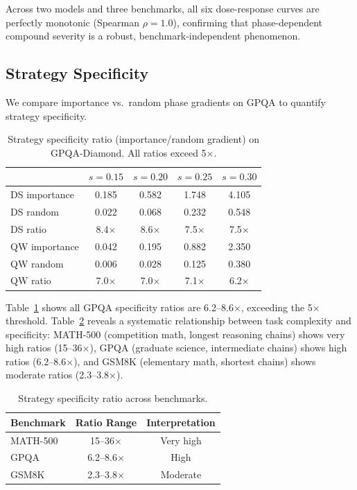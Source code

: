 \documentclass[11pt,a4paper]{article}
\begin{document}
Across two models and three benchmarks, all six dose-response curves are perfectly monotonic (Spearman $\rho=1.0$), confirming that phase-dependent compound severity is a robust, benchmark-independent phenomenon.

\subsection{Strategy Specificity}
\label{sec:specificity}

We compare importance vs.\ random phase gradients on GPQA to quantify strategy specificity.

\begin{table}[t]
\centering
\small
\caption{Strategy specificity ratio (importance/random gradient) on GPQA-Diamond. All ratios exceed 5$\times$.}
\label{tab:specificity_gpqa}
\begin{tabular}{lcccc}
\toprule
& $s=0.15$ & $s=0.20$ & $s=0.25$ & $s=0.30$ \\
\midrule
DS importance & 0.185 & 0.582 & 1.748 & 4.105 \\
DS random & 0.022 & 0.068 & 0.232 & 0.548 \\
DS ratio & 8.4$\times$ & 8.6$\times$ & 7.5$\times$ & 7.5$\times$ \\
\midrule
QW importance & 0.042 & 0.195 & 0.882 & 2.350 \\
QW random & 0.006 & 0.028 & 0.125 & 0.380 \\
QW ratio & 7.0$\times$ & 7.0$\times$ & 7.1$\times$ & 6.2$\times$ \\
\bottomrule
\end{tabular}
\end{table}

Table~\ref{tab:specificity_gpqa} shows all GPQA specificity ratios are 6.2--8.6$\times$, exceeding the 5$\times$ threshold. Table~\ref{tab:specificity_cross} reveals a systematic relationship between task complexity and specificity: MATH-500 (competition math, longest reasoning chains) shows very high ratios (15--36$\times$), GPQA (graduate science, intermediate chains) shows high ratios (6.2--8.6$\times$), and GSM8K (elementary math, shortest chains) shows moderate ratios (2.3--3.8$\times$).

\begin{table}[t]
\centering
\small
\caption{Strategy specificity ratio across benchmarks.}
\label{tab:specificity_cross}
\begin{tabular}{lcc}
\toprule
Benchmark & Ratio Range & Interpretation \\
\midrule
MATH-500 & 15--36$\times$ & Very high \\
GPQA & 6.2--8.6$\times$ & High \\
GSM8K & 2.3--3.8$\times$ & Moderate \\
\bottomrule
\end{tabular}
\end{table}
\end{document}
